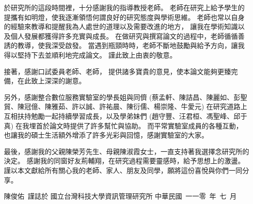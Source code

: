 
\begin{acknowledgement}

    於研究所的這段時間裡，十分感謝我的指導教授\underline{\advisor}老師。
老師在研究上給予學生的提攜有如明燈，使我逐漸領悟何謂良好的研究態度與學術思維。
老師也常以自身的經驗來教導和提醒我為人處世的道理以及需要改進的地方，
讓我在學術知識以及個人發展都獲得許多充實與成長。
在做研究與撰寫論文的過程中，老師循循善誘的教導，使我深受啟發。
當遇到瓶頸時時，老師不斷地鼓勵與給予方向，讓我得以堅持下去並順利地完成論文。
謹此致上由衷的敬意。

    接著，感謝口試委員\underline{\qquad}老師、\underline{\qquad}老師，
提供諸多寶貴的意見，使本論文能夠更臻完備，在此致上深深的謝意。

    另外，感謝整合數位服務實驗室的學長姐與同儕
(蔡孟軒、陳詰昌、陳麗如、彭聖貿、陳冠億、陳雅茹、許以誠、許祐晨、陳衍儒、楊崇隆、牛愛元)
在研究道路上互相扶持勉勵一起持續學習成長，以及學弟妹們
(趙守豐、汪君桓、馮聖峰、邱于真)
在我埋首於論文時提供了許多幫忙與協助。
而平常實驗室成員的各種互動，也讓我的碩士生活額外增添了許多光彩與回憶，感謝實驗室的大家。

    最後，感謝我的父親陳榮芳先生、母親陳淑霞女士，一直支持著我選擇念研究所的決定。
感謝我的同窗好友荊輔翔，在研究過程需要靈感時，給予思想上的激盪。
謹以本文獻給所有關心我的老師、家人、朋友及同學，願將這份喜悅與你們一同分享。

\mbox{}
\vfill
\mbox{}\hfill 陳俊佑~謹誌於
\newline
\mbox{}\hfill 國立台灣科技大學資訊管理研究所
\newline
\mbox{}\hfill 中華民國~一一零~年~七~月
\bigbreak

\end{acknowledgement}